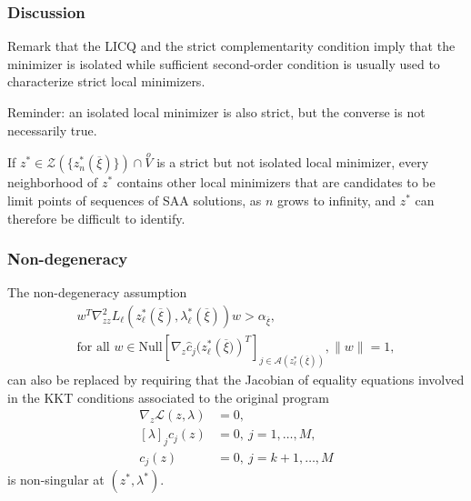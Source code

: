 \documentclass{beamer}
\begin{document}
\begin{frame}
\frametitle{Discussion}

Remark that the LICQ and the strict complementarity condition imply that the minimizer is isolated while sufficient second-order condition is usually used to characterize strict local minimizers.

\mbox{}

Reminder: an isolated local minimizer is also strict, but the converse is not necessarily true.

\mbox{}

If $z^* \in\mathcal{Z} \left(\lbrace z^*_n(\overline{\xi})\rbrace\right)
\cap \overset{o}{V}$ is a strict but not isolated local minimizer, every neighborhood of $z^*$ contains other local minimizers that are candidates to be limit points of sequences of SAA solutions, as $n$ grows to infinity, and $z^*$ can therefore be difficult to identify.

\end{frame}

\begin{frame}
\frametitle{Non-degeneracy}

The non-degeneracy assumption
\begin{multline*}
w^T \nabla_{zz}^2 L_{\ell} \left(z^*_{\ell}(\overline{\xi}),
\lambda^*_{\ell}(\overline{\xi}) \right) w > \alpha_{\overline{\xi}}, \\
\text{for all }w \in
\text{Null}\left[\nabla_z \hat{c}_j(z^*_{\ell} \left( \overline{\xi})
  \right)^T \right]_{j \in \mathcal{A} (z^*_{\ell}(\overline{\xi})) },
 \|w\|=1,
\label{eq:nondegeneracy}
\end{multline*}
can also be replaced by requiring that the Jacobian of equality equations involved in the KKT conditions associated to the original program
\begin{align*}
\nabla_z \mathcal{L}(z, \lambda) & = 0,\\
[\lambda]_j c_j(z) & = 0,\ j = 1,\ldots,M,\\
c_j(z) & = 0,\ j = k+1,\ldots,M
\end{align*}
is non-singular at $(z^*, \lambda^*)$.

\end{frame}
\end{document}
